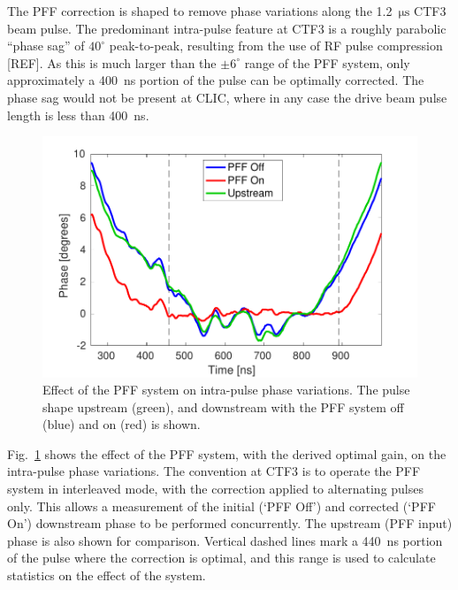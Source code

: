 \documentclass[%
 reprint,
superscriptaddress,
 amsmath,amssymb,
 prl,
]{revtex4-1}
\begin{document}

The PFF correction is shaped to remove phase variations along the 
1.2~\(\mathrm{\mu s}\) CTF3 beam pulse. The predominant intra-pulse feature at 
CTF3 is a roughly parabolic ``phase sag'' of \(40^\circ\) peak-to-peak, 
resulting from the use of RF pulse compression [REF]. As this is much larger 
than the 
\(\pm 6^\circ\) range of the PFF system, only approximately a 400~ns portion of 
the pulse can be optimally corrected. The phase sag would not be present at 
CLIC, where in any case the drive beam pulse length is less than 400~ns.



\begin{figure}
	\includegraphics[width=\columnwidth]{figs/shape}%
	\caption{\label{fig:shape}Effect of the PFF system on intra-pulse phase 
		variations. The pulse shape upstream (green), and downstream with the 
		PFF 
		system off (blue) and on (red) is shown.}
\end{figure}


Fig.~\ref{fig:shape} shows the effect of the PFF system, with the derived 
optimal gain, on the intra-pulse phase variations. The convention at CTF3 is to 
operate the PFF system in interleaved mode, with 
the correction applied to alternating pulses only. This allows a measurement of 
the initial (`PFF Off') and corrected (`PFF On') downstream phase to be 
performed concurrently. The upstream (PFF input) phase is also shown for 
comparison. Vertical dashed lines mark a 440~ns portion of the pulse where the 
correction is optimal, and this range is used to calculate statistics on the 
effect of the system. 
\end{document}
